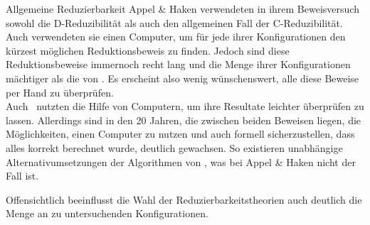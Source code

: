 \begin{section}{Allgemeine Reduzierbarkeit}
 Appel \& Haken verwendeten in ihrem Beweisversuch sowohl die D-Reduzibilität als auch den allgemeinen Fall der C-Reduzibilität. Auch verwendeten sie einen Computer, um für jede ihrer Konfigurationen den kürzest möglichen Reduktionsbeweis zu finden. Jedoch sind diese Reduktionsbeweise immernoch recht lang und die Menge ihrer Konfigurationen mächtiger als die von \rsst. Es erscheint also wenig wünschenswert, alle diese Beweise per Hand zu überprüfen. \\
 Auch \rsst\-\ nutzten die Hilfe von Computern, um ihre Resultate leichter überprüfen zu lassen. Allerdings sind in den 20 Jahren, die zwischen beiden Beweisen liegen, die Möglichkeiten, einen Computer zu nutzen und auch formell sicherzustellen, dass alles korrekt berechnet wurde, deutlich gewachsen. So existieren unabhängige Alternativumsetzungen der Algorithmen von \rsst, was bei Appel \& Haken nicht der Fall ist. 
 
 Offensichtlich beeinflusst die Wahl der Reduzierbarkeitstheorien auch deutlich die Menge an zu untersuchenden Konfigurationen.
\end{section}
